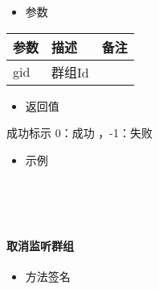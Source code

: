 \documentclass[letterpaper,10pt,english]{sphinxmanual}
\begin{document}
%
\begin{sphinxVerbatim}[commandchars=\\\{\}]
   
\end{sphinxVerbatim}
\begin{itemize}
\item {} 
参数

\end{itemize}


\begin{savenotes}\sphinxattablestart
\centering
\begin{tabulary}{\linewidth}[t]{|T|T|T|}
\hline
\sphinxstyletheadfamily 
参数
&\sphinxstyletheadfamily 
描述
&\sphinxstyletheadfamily 
备注
\\
\hline
gid
&
群组Id
&\\
\hline
\end{tabulary}
\par
\sphinxattableend\end{savenotes}
\begin{itemize}
\item {} 
返回值

\end{itemize}

成功标示 0：成功 ，-1：失败
\begin{itemize}
\item {} 
示例

\end{itemize}

%
\begin{sphinxVerbatim}[commandchars=\\\{\}]
   
    
  
      
\end{sphinxVerbatim}

​

​


\paragraph{取消监听群组}
\label{\detokenize{csharp:id44}}\begin{itemize}
\item {} 
方法签名

\end{itemize}
\end{document}
